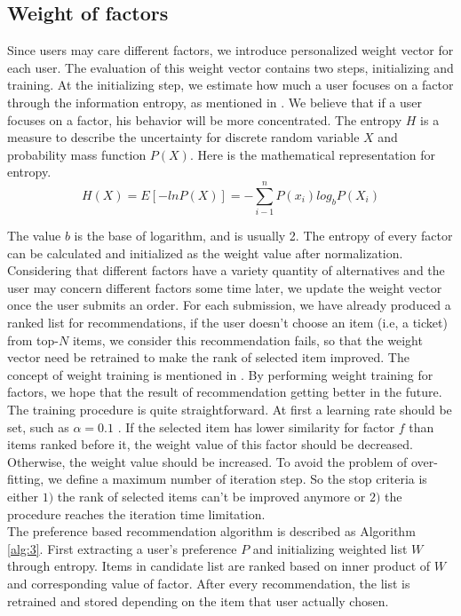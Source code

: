 \documentclass{llncs}
\begin{document}
\subsection{Weight of factors}
Since users may care different factors, we introduce personalized weight vector for each user. The evaluation of this weight vector contains two steps, initializing and training. At the initializing step, we estimate how much a user focuses on a factor through the information entropy, as mentioned in \cite{yang:pers}. We believe that if a user focuses on a factor, his behavior will be more concentrated. The entropy $H$ is a measure to describe the uncertainty for discrete random variable $X$ and probability mass function $P(X)$. Here is the mathematical representation for entropy.\\
\begin{equation}
H(X)=E[-lnP(X)]= - \sum_{i-1}^n P(x_i)log_bP(X_i)
\end{equation}\par
The value $b$ is the base of logarithm, and is usually 2. The entropy of every factor can be calculated and initialized as the weight value after normalization. Considering that different factors have a variety quantity of alternatives and the user may concern different factors some time later, we update the weight vector once the user submits an order. For each submission, we have already produced a ranked list for recommendations, if the user doesn't choose an item (i.e, a ticket) from top-$N$ items, we consider this recommendation fails, so that the weight vector need be retrained to make the rank of selected item improved. The concept of weight training is mentioned in \cite{lor:flight}. By performing weight training for factors, we hope that the result of recommendation getting better in the future. The training procedure is quite straightforward. At first a learning rate should be set, such as $\alpha = 0.1$ . If the selected item has lower similarity for factor $f$ than items ranked before it, the weight value of this factor should be decreased. Otherwise, the weight value should be increased. To avoid the problem of over-fitting, we define a maximum number of iteration step. So the stop criteria is either $1)$ the rank of selected items can't be improved anymore or $2)$ the procedure reaches the iteration time limitation.\\
The preference based recommendation algorithm is described as Algorithm \ref{alg:3}. First extracting a user's preference  $P$ and initializing weighted list $W$ through entropy. Items in candidate list are ranked based on inner product of $W$ and corresponding value of factor. After every recommendation, the list is retrained and stored depending on the item that user actually chosen.
\end{document}
